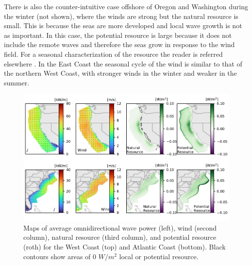 There is also the counter-intuitive case offshore of Oregon and Washington during the winter (not shown), where the winds are strong but the natural resource is small. This is because the seas are more developed and local wave growth is not as important. In this case, the potential resource is large because it does not include the remote waves and therefore the seas grow in response to the wind field. For a seasonal characterization of the resource the reader is referred elsewhere  \citep[e.g.][]{garcia-medinaWaveResourceAssessment2014,lenee-bluhm_characterizing_2011,yangCharacteristicsVariabilityNearshore2020}. In the East Coast the seasonal cycle of the wind is similar to that of the northern West Coast, with stronger winds in the winter and weaker in the summer.


\begin{figure}[ht]
  \centering
  \includegraphics[width=\textwidth]{../fig/Yearly_spatial_seasonal_mag_6.pdf}
  \caption{Maps of average omnidirectional wave power (left), wind (second column), natural resource (third column), and potential resource (roth) for the West Coast (top) and Atlantic Coast (bottom). Black contours show areas of 0 $W/m^{2}$ local or potential resource.}
  \label{fig:maps}
\end{figure}

